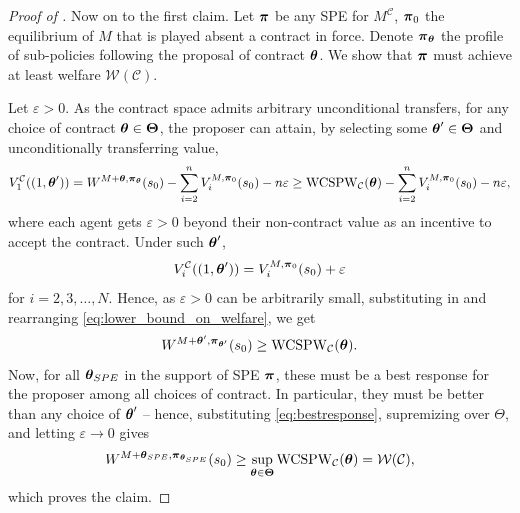 \begin{proof}[Proof of ]
Now on to the first claim. Let $\boldsymbol{\pi}$ be any SPE for $M^{\mathcal C}$, $\boldsymbol{\pi}_0$ the equilibrium of $M$ that is played absent a contract in force. Denote $\boldsymbol{\pi}_{\boldsymbol{\theta}}$ the profile of sub-policies following the proposal of contract $\boldsymbol{\theta}$. We show that $\boldsymbol{\pi}$ must achieve at least welfare $\mathcal W (\mathcal C)$. 

Let $\varepsilon > 0$. As the contract space admits arbitrary unconditional transfers, for any choice of contract $\boldsymbol{\theta} \in \boldsymbol{\Theta}$, the proposer can attain, by selecting some $\boldsymbol{\theta}' \in \boldsymbol{\Theta}$ and unconditionally transferring value,
\begin{equation}
V_1^{{\mathcal{C}}}((1,{\boldsymbol{\theta}}')) = W^{M+{\boldsymbol{\theta}}, \boldsymbol{\pi}_{\boldsymbol{\theta}}}(s_0) - \sum_{i=2}^n V_i^{M, \boldsymbol{\pi}_0}(s_0) - n \varepsilon \ge \operatorname{WCSPW}_{\mathcal C} (\boldsymbol{\theta}) - \sum_{i=2}^n V_i^{M, \boldsymbol{\pi}_0}(s_0) - n \varepsilon,\label{eq:lower_bound_on_welfare}
\end{equation}
where each agent gets $\varepsilon>0$ beyond their non-contract value as an incentive to accept the contract. Under such $\boldsymbol{\theta}'$, 
\[
V_i^{{\mathcal{C}}}((1,{\boldsymbol{\theta}'})) = V_i^{M, \boldsymbol{\pi}_0}(s_0) + \varepsilon
\]
for $i=2, 3, \dots, N$. Hence, as $\varepsilon > 0$ can be arbitrarily small, substituting in and rearranging \eqref{eq:lower_bound_on_welfare}, we get 
\begin{equation}
W^{M+{\boldsymbol{\theta}'}, \boldsymbol{\pi}_{\boldsymbol{\theta}'}}(s_0) \ge \operatorname{WCSPW}_{\mathcal C} (\boldsymbol{\theta}). \label{eq:bestresponse}
\end{equation}
Now, for all $\boldsymbol{\theta}_{SPE}$ in the support of SPE $\boldsymbol{\pi}$, these must be a best response for the proposer among all choices of contract. In particular, they must be better than any choice of $\boldsymbol{\theta}'$ -- hence, substituting \eqref{eq:bestresponse}, supremizing over $\Theta$, and letting $\varepsilon \to 0$  gives
\[
W^{M+{\boldsymbol{\theta}_{SPE}}, \boldsymbol{\pi}_{\boldsymbol{\theta}_{SPE}}}(s_0) \ge \sup_{\boldsymbol{\theta} \in \boldsymbol{\Theta}} \operatorname{WCSPW}_{\mathcal C} (\boldsymbol{\theta}) = \mathcal W(\mathcal C),
\]
which proves the claim.
\end{proof}

